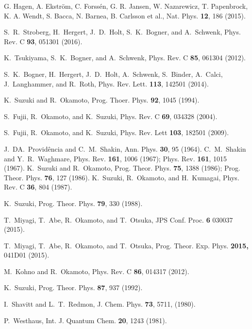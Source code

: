 \documentclass[aps,prc, dvips, twocolumn,groupedaddress,showkeys,showpacs,floatfix,superscriptaddress]{revtex4-1}
\newcommand{\<}{\langle}
\renewcommand{\>}{\rangle}
\begin{document}
\begin{thebibliography}{99}
G. Hagen, A. Ekstr{\"o}m, C. Forss{\'e}n, G. R. Jansen, W. Nazarewicz, T. Papenbrock, K. A. Wendt, S. Bacca, N. Barnea, B. Carlsson et al., Nat. Phys. {\bf 12}, 186 (2015).

S.~R.~Stroberg, H.~Hergert, J.~D.~Holt, S.~K.~Bogner, and A.~Schwenk, Phys. Rev. C {\bf 93}, 051301 (2016).

K.~Tsukiyama, S.~K.~Bogner, and A.~Schwenk, Phys. Rev. C {\bf 85}, 061304 (2012).

S.~K.~Bogner, H.~Hergert, J.~D.~Holt, A.~Schwenk, S.~Binder, A.~Calci, J.~Langhammer, and R.~Roth, Phys. Rev. Lett. {\bf 113}, 142501 (2014).

	K.~Suzuki and R.~Okamoto,
  Prog. Thoer. Phys. {\bf 92}, 1045 (1994).

  S.~Fujii, R.~Okamoto, and K.~Suzuki, Phys. Rev. C {\bf 69}, 034328 (2004).

  S.~Fujii, R.~Okamoto, and K.~Suzuki, Phys. Rev. Lett {\bf 103}, 182501 (2009).

  J.~DA.~Provid\^encia and C.~M.~Shakin, Ann. Phys. {\bf 30}, 95 (1964).
  C.~M.~Shakin and Y.~R.~Waghmare, Phys. Rev. {\bf 161}, 1006 (1967); Phys. Rev. {\bf 161}, 1015 (1967).
  K.~Suzuki and R.~Okamoto, Prog. Theor. Phys. {\bf 75}, 1388 (1986); Prog. Theor. Phys. {\bf 76}, 127 (1986).
  K.~Suzuki, R.~Okamoto, and H.~Kumagai, Phys. Rev. C {\bf 36}, 804 (1987).

   K.~Suzuki, Prog. Theor. Phys. {\bf 79}, 330 (1988).

	T.~Miyagi, T.~Abe, R.~Okamoto, and T.~Otsuka,
	JPS Conf. Proc. {\bf 6} 030037 (2015).

	T.~Miyagi, T.~Abe, R.~Okamoto, and T.~Otsuka,
	Prog. Theor. Exp. Phys. {\bf 2015,} 041D01 (2015).

  M.~Kohno and R.~Okamoto, Phys. Rev. C {\bf 86}, 014317 (2012).

   K.~Suzuki, Prog. Theor. Phys. {\bf 87}, 937 (1992).

	 I.~Shavitt and L.~T.~Redmon,
	 J. Chem. Phys. {\bf 73}, 5711, (1980).

	 P.~Westhaus,
	 Int. J. Quantum Chem. {\bf 20}, 1243 (1981).


\end{thebibliography}
\end{document}
